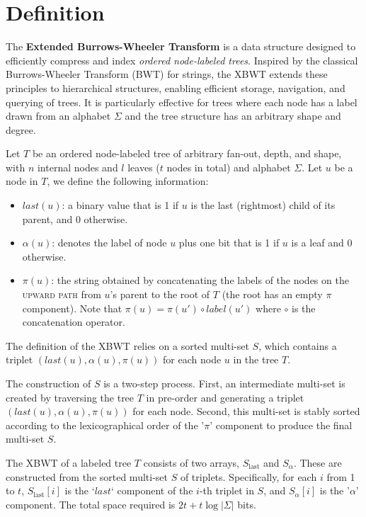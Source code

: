 \section{Definition}
The \textbf{Extended Burrows-Wheeler Transform} is a data structure designed to efficiently compress and index \emph{ordered node-labeled trees}. Inspired by the classical Burrows-Wheeler Transform (BWT) \cite{burrows1994block} for strings, the XBWT extends these principles to hierarchical structures, enabling efficient storage, navigation, and querying of trees. It is particularly effective for trees where each node has a label drawn from an alphabet $\Sigma$ and the tree structure has an arbitrary shape and degree.

\begin{definition} 
    \label{def:node_informations}
    Let $T$ be an ordered node-labeled tree of arbitrary fan-out, depth, and shape, with $n$ internal nodes and $l$ leaves ($t$ nodes in total) and alphabet $\Sigma$. Let $u$ be a node in $T$, we define the following information:
    \begin{itemize}
        \item $last(u)$: a binary value that is 1 if $u$ is the last (rightmost) child of its parent, and 0 otherwise.
        \item $\alpha(u)$: denotes the label of node $u$ plus one bit that is 1 if $u$ is a leaf and 0 otherwise.
        \item $\pi(u)$: the string obtained by concatenating the labels of the nodes on the \textsc{upward path} from $u$'s parent to the root of $T$ (the root has an empty $\pi$ component). Note that $\pi(u) = \pi(u') \circ label(u')$ where $\circ$ is the concatenation operator.
    \end{itemize}
\end{definition}

The definition of the XBWT relies on a sorted multi-set $S$, which contains a triplet $(last(u), \alpha(u), \pi(u))$ for each node $u$ in the tree $T$.

The construction of $S$ is a two-step process. First, an intermediate multi-set is created by traversing the tree $T$ in pre-order and generating a triplet $(last(u), \alpha(u), \pi(u))$ for each node. Second, this multi-set is stably sorted according to the lexicographical order of the '$\pi$' component to produce the final multi-set $S$.

\begin{theorem}
    The XBWT of a labeled tree $T$ consists of two arrays, $S_{\text{last}}$ and $S_{\alpha}$. These are constructed from the sorted multi-set $S$ of triplets. Specifically, for each $i$ from 1 to $t$, $S_{\text{last}}[i]$ is the `$last$` component of the $i$-th triplet in $S$, and $S_{\alpha}[i]$ is the '$\alpha$' component. The total space required is $2t + t \log |\Sigma|$ bits.
\end{theorem}


